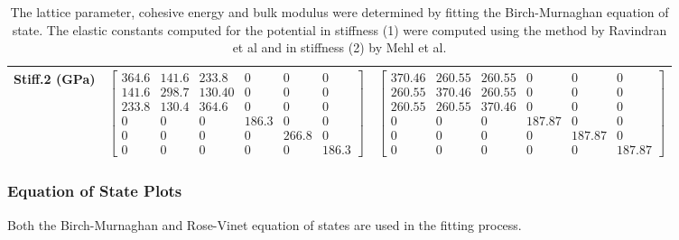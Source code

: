 \begin{table}[ht]
\begin{tabular}{lcccccc}
Stiff.2 (GPa) & \multicolumn{3}{c}{$\begin{bmatrix} 364.6 & 141.6 & 233.8 & 0 & 0 & 0 \\ 141.6 & 298.7 & 130.40 & 0 & 0 & 0 \\ 233.8 & 130.4 & 364.6 & 0 & 0 & 0 \\ 0 & 0 & 0 & 186.3 & 0 & 0 \\ 0 & 0 & 0 & 0 & 266.8 & 0 \\ 0 & 0 & 0 & 0 & 0 & 186.3 \end{bmatrix}$}   & \multicolumn{3}{c}{$\begin{bmatrix} 370.46 & 260.55 & 260.55 & 0 & 0 & 0 \\ 260.55 & 370.46 & 260.55 & 0 & 0 & 0 \\ 260.55 & 260.55 & 370.46 & 0 & 0 & 0 \\ 0 & 0 & 0 & 187.87 & 0 & 0 \\ 0 & 0 & 0 & 0 & 187.87 & 0 \\ 0 & 0 & 0 & 0 & 0 & 187.87 \end{bmatrix}$} \\
\hline\hline
\end{tabular}
\caption{The lattice parameter, cohesive energy and bulk modulus were determined by fitting the Birch-Murnaghan equation of state.  The elastic constants computed for the potential in stiffness (1) were computed using the method by Ravindran et al\cite{dfttisiravindran} and in stiffness (2) by Mehl et al\cite{mehlsp}\cite{elasticpropertiesmehl}.}
\label{table:fepd-fefcc-dftvspotential}
\end{table}


\subsubsection{Equation of State Plots}

Both the Birch-Murnaghan and Rose-Vinet equation of states are used in the fitting process.

